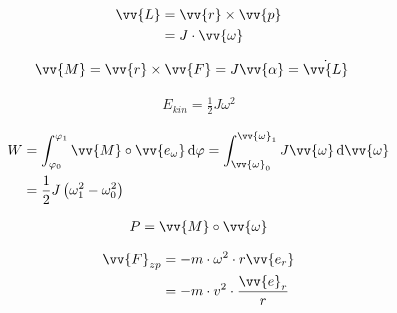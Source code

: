\begin{boxleft}
\end{boxleft}\begin{boxrightshaded}
\begin{align*}
\vv{L}&=\vv{r}\times\vv{p} \\
&=J\cdot \vv{\omega}
\end{align*}
\end{boxrightshaded}

\begin{boxleft}
\end{boxleft}\begin{boxrightshaded}
\begin{align*}
\vv{M}&=\vv{r}\times\vv{F}=J\vv{\alpha}=\dot{\vv{L}}
\end{align*}
\end{boxrightshaded}

\begin{boxleft}
\end{boxleft}\begin{boxrightshaded}
\begin{align*}
E_{kin}=\frac{1}{2}J\omega^2
\end{align*}
\end{boxrightshaded}

\begin{boxleft}
\end{boxleft}\begin{boxrightshaded}
\begin{align*}
W	&=\int_{\varphi_0}^{\varphi_1}\vv{M}\circ\vv{e_\omega}\diff \varphi=\int_{\vv{\omega}_0}^{\vv{\omega}_1}J\vv{\omega}\diff\vv{\omega}\\
&=\frac{1}{2}J\left(\omega_1^2-\omega_0^2\right)
\end{align*}
\end{boxrightshaded}


\begin{boxleft}
\end{boxleft}\begin{boxrightshaded}
\begin{align*}
P=\vv{M}\circ\vv{\omega}
\end{align*}
\end{boxrightshaded}

\begin{boxleft}
\end{boxleft}\begin{boxrightshaded}
\begin{align*}
\vv{F}_{zp}&=-m\cdot\omega^2\cdot r\vv{e_r}\\
&=-m\cdot v^2\cdot \frac{\vv{e}_r}{r}
\end{align*}
\end{boxrightshaded}

